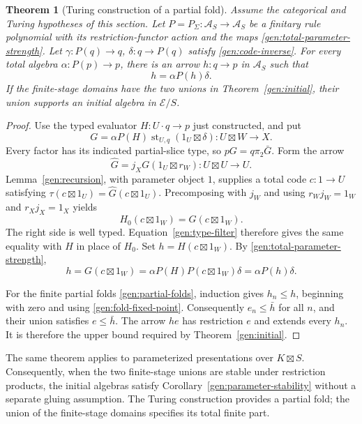 \documentclass[11pt]{article}
\newtheorem{theorem}{Theorem}[section]
\theoremstyle{definition}
\theoremstyle{remark}
\begin{document}
\begin{theorem}[Turing construction of a partial fold]\label{gen:turing-fold}
Assume the categorical and Turing hypotheses of this section. Let
$P=P_\Sigma:\mathscr A_S\to\mathscr A_S$ be a finitary rule
polynomial with its restriction-functor action and the maps
\eqref{gen:total-parameter-strength}. Let
$\gamma:P(q)\to q$, $\delta:q\to P(q)$ satisfy
\eqref{gen:code-inverse}. For every total algebra
$\alpha:P(p)\to p$, there is an arrow $h:q\to p$ in
$\mathscr A_S$ such that
\begin{equation}\label{gen:fold-fixed-point}
 h=\alpha P(h)\delta.
\end{equation}
If the finite-stage domains have the two unions in
Theorem~\ref{gen:initial}, their union supports an initial algebra
in $\mathscr E/S$.
\end{theorem}
\begin{proof}
Use the typed evaluator $H:U\cdot q\to p$ just constructed, and put
\[
 G=\alpha P(H)\operatorname{st}_{U,q}
                  (1_U\boxtimes\delta):U\boxtimes W\to X.
\]
Every factor has its indicated partial-slice type, so
$pG=q\pi_2\bar G$. Form the arrow
\[
 \widehat G=j_XG(1_U\boxtimes r_W):U\boxtimes U\to U.
\]
Lemma~\ref{gen:recursion}, with parameter object $1$, supplies a
total code $c:1\to U$ satisfying
$\tau(c\boxtimes1_U)=\widehat G(c\boxtimes1_U)$.
Precomposing with $j_W$ and using $r_Wj_W=1_W$ and
$r_Xj_X=1_X$ yields
\[
 H_0(c\boxtimes1_W)=G(c\boxtimes1_W).
\]
The right side is well typed. Equation~\eqref{gen:type-filter}
therefore gives the same equality with $H$ in place of $H_0$.
Set $h=H(c\boxtimes1_W)$. By
\eqref{gen:total-parameter-strength},
\[
 h=G(c\boxtimes1_W)
   =\alpha P(H)P(c\boxtimes1_W)\delta
   =\alpha P(h)\delta.
\]

For the finite partial folds \eqref{gen:partial-folds}, induction
gives $h_n\le h$, beginning with zero and using
\eqref{gen:fold-fixed-point}. Consequently $e_n\le\bar h$ for all
$n$, and their union satisfies $e\le\bar h$. The arrow $he$ has
restriction $e$ and extends every $h_n$. It is therefore the upper
bound required by Theorem~\ref{gen:initial}.
\end{proof}

The same theorem applies to parameterized presentations over
$K\boxtimes S$. Consequently, when the two finite-stage unions are
stable under restriction products, the initial algebras satisfy
Corollary~\ref{gen:parameter-stability} without a separate gluing
assumption. The Turing construction provides a partial fold;
the union of the finite-stage domains specifies its total finite part.
\end{document}
